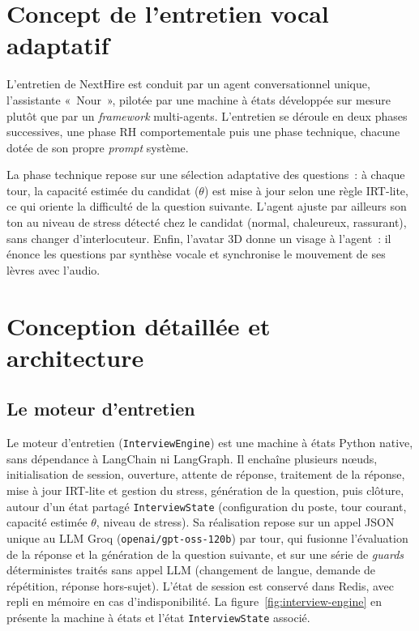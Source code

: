 \section{Concept de l'entretien vocal adaptatif}

L'entretien de NextHire est conduit par un agent conversationnel unique, l'assistante «~Nour~», pilotée par une machine à états développée sur mesure plutôt que par un \textit{framework} multi-agents. L'entretien se déroule en deux phases successives, une phase RH comportementale puis une phase technique, chacune dotée de son propre \textit{prompt} système.

La phase technique repose sur une sélection adaptative des questions~: à chaque tour, la capacité estimée du candidat ($\theta$) est mise à jour selon une règle IRT-lite, ce qui oriente la difficulté de la question suivante. L'agent ajuste par ailleurs son ton au niveau de stress détecté chez le candidat (normal, chaleureux, rassurant), sans changer d'interlocuteur. Enfin, l'avatar 3D donne un visage à l'agent~: il énonce les questions par synthèse vocale et synchronise le mouvement de ses lèvres avec l'audio.

\section{Conception détaillée et architecture}

\subsection{Le moteur d'entretien}

Le moteur d'entretien (\texttt{InterviewEngine}) est une machine à états Python native, sans dépendance à LangChain ni LangGraph. Il enchaîne plusieurs nœuds, initialisation de session, ouverture, attente de réponse, traitement de la réponse, mise à jour IRT-lite et gestion du stress, génération de la question, puis clôture, autour d'un état partagé \texttt{InterviewState} (configuration du poste, tour courant, capacité estimée $\theta$, niveau de stress). Sa réalisation repose sur un appel JSON unique au LLM Groq (\texttt{openai/gpt-oss-120b}) par tour, qui fusionne l'évaluation de la réponse et la génération de la question suivante, et sur une série de \textit{guards} déterministes traités sans appel LLM (changement de langue, demande de répétition, réponse hors-sujet). L'état de session est conservé dans Redis, avec repli en mémoire en cas d'indisponibilité. La figure~\ref{fig:interview-engine} en présente la machine à états et l'état \texttt{InterviewState} associé.

